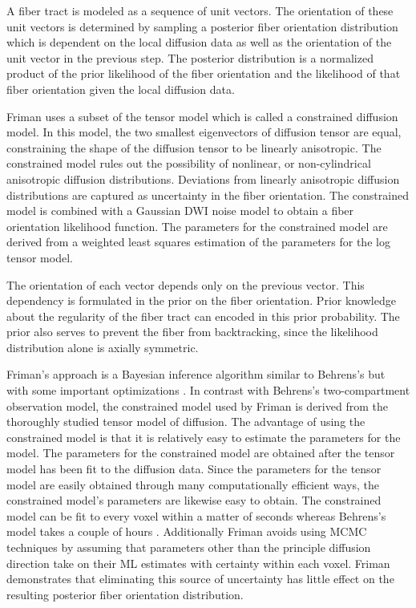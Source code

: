 \documentclass{InsightArticle}
\begin{document}
A fiber tract is modeled as a sequence of unit vectors.  The orientation of these unit vectors is determined by sampling a posterior fiber orientation distribution which is dependent on the local diffusion data as well as the orientation of the unit vector in the previous step.  The posterior distribution is a normalized product of the prior likelihood of the fiber orientation and the likelihood of that fiber orientation given the local diffusion data.

Friman uses a subset of the tensor model which is called a constrained diffusion model.  In this model, the two smallest eigenvectors of diffusion tensor are equal, constraining the shape of the diffusion tensor to be linearly anisotropic.  The constrained model rules out the possibility of nonlinear, or non-cylindrical anisotropic diffusion distributions.  Deviations from linearly anisotropic diffusion distributions are captured as uncertainty in the fiber orientation.  The constrained model is combined with a Gaussian DWI noise model to obtain a fiber orientation likelihood function.  The parameters for the constrained model are derived from a weighted least squares estimation of the parameters for the log tensor model.

The orientation of each vector depends only on the previous vector.  This dependency is formulated in the prior on the fiber orientation.  Prior knowledge about the regularity of the fiber tract can encoded in this prior probability.  The prior also serves to prevent the fiber from backtracking, since the likelihood distribution alone is axially symmetric.

Friman's approach is a Bayesian inference algorithm similar to Behrens's but with some important optimizations \cite{frimanTMI06}.  In contrast with Behrens's two-compartment observation model, the constrained model used by Friman is derived from the thoroughly studied tensor model of diffusion.  The advantage of using the constrained model is that it is relatively easy to estimate the parameters for the model.  The parameters for the constrained model are obtained after the tensor model has been fit to the diffusion data.  Since the parameters for the tensor model are easily obtained through many computationally efficient ways, the constrained model's parameters are likewise easy to obtain.  The constrained model can be fit to every voxel within a matter of seconds whereas Behrens's model takes a couple of hours \cite{frimanTMI06}.  Additionally Friman avoids using MCMC techniques by assuming that parameters other than the principle diffusion direction take on their ML estimates with certainty within each voxel.  Friman demonstrates that eliminating this source of uncertainty has little effect on the resulting posterior fiber orientation distribution.
\end{document}

